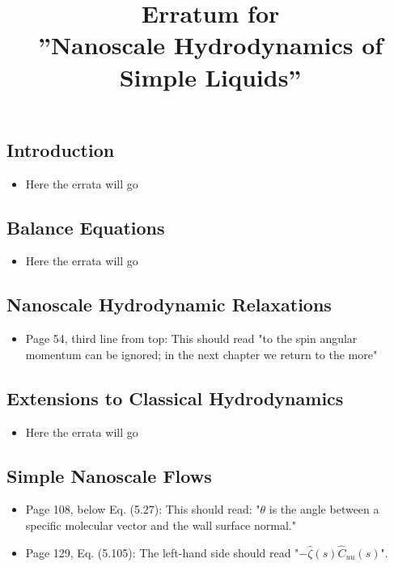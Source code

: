 \documentclass{article}
\title{Erratum for \\ ''Nanoscale Hydrodynamics of Simple Liquids''}
\date{}
\begin{document}
\maketitle

\subsection*{Introduction}
\begin{itemize}
\item Here the errata will go
\end{itemize}

\subsection*{Balance Equations}
\begin{itemize}
\item Here the errata will go
\end{itemize}

\subsection*{Nanoscale Hydrodynamic Relaxations}
\begin{itemize}
\item Page 54, third line from top: This should read "to the spin angular momentum can be ignored; in the next chapter we return to the more"
\end{itemize}

\subsection*{Extensions to Classical Hydrodynamics}
\begin{itemize}
\item Here the errata will go
\end{itemize}

\subsection*{Simple Nanoscale Flows}
\begin{itemize}
\item Page 108, below Eq. (5.27): This should read: "$\theta$ is the angle between a specific molecular vector and the wall surface normal."
\item Page 129, Eq. (5.105): The left-hand side should read "$-\widehat{\zeta}(s)\widehat{C}_{uu}(s)$".
\end{itemize}
\end{document}
